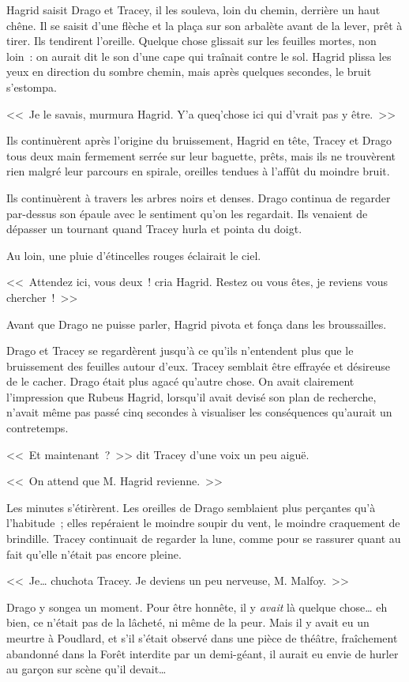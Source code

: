 Hagrid saisit Drago et Tracey, il les souleva, loin du chemin, derrière un haut chêne. Il se saisit d'une flèche et la plaça sur son arbalète avant de la lever, prêt à tirer. Ils tendirent l'oreille. Quelque chose glissait sur les feuilles mortes, non loin~: on aurait dit le son d'une cape qui traînait contre le sol. Hagrid plissa les yeux en direction du sombre chemin, mais après quelques secondes, le bruit s'estompa.

<<~Je le savais, murmura Hagrid. Y'a queq'chose ici qui d'vrait pas y être.~>>

Ils continuèrent après l'origine du bruissement, Hagrid en tête, Tracey et Drago tous deux main fermement serrée sur leur baguette, prêts, mais ils ne trouvèrent rien malgré leur parcours en spirale, oreilles tendues à l'affût du moindre bruit.

Ils continuèrent à travers les arbres noirs et denses. Drago continua de regarder par-dessus son épaule avec le sentiment qu'on les regardait. Ils venaient de dépasser un tournant quand Tracey hurla et pointa du doigt.

Au loin, une pluie d'étincelles rouges éclairait le ciel.

<<~Attendez ici, vous deux~! cria Hagrid. Restez ou vous êtes, je reviens vous chercher~!~>>

Avant que Drago ne puisse parler, Hagrid pivota et fonça dans les broussailles.

Drago et Tracey se regardèrent jusqu'à ce qu'ils n'entendent plus que le bruissement des feuilles autour d'eux. Tracey semblait être effrayée et désireuse de le cacher. Drago était plus agacé qu'autre chose. On avait clairement l'impression que Rubeus Hagrid, lorsqu'il avait devisé son plan de recherche, n'avait même pas passé cinq secondes à visualiser les conséquences qu'aurait un contretemps.

<<~Et maintenant~?~>> dit Tracey d'une voix un peu aiguë.

<<~On attend que M. Hagrid revienne.~>>

Les minutes s'étirèrent. Les oreilles de Drago semblaient plus perçantes qu'à l'habitude~; elles repéraient le moindre soupir du vent, le moindre craquement de brindille. Tracey continuait de regarder la lune, comme pour se rassurer quant au fait qu'elle n'était pas encore pleine.

<<~Je… chuchota Tracey. Je deviens un peu nerveuse, M. Malfoy.~>>

Drago y songea un moment. Pour être honnête, il y \emph{avait} là quelque chose… eh bien, ce n'était pas de la lâcheté, ni même de la peur. Mais il y avait eu un meurtre à Poudlard, et s'il s'était observé dans une pièce de théâtre, fraîchement abandonné dans la Forêt interdite par un demi-géant, il aurait eu envie de hurler au garçon sur scène qu'il devait…

